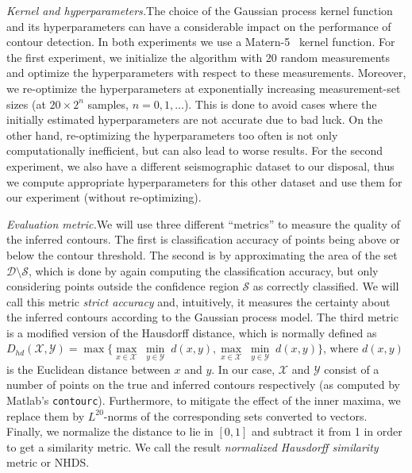\documentclass[11pt]{article} %
\begin{document}
\noindent\emph{Kernel and hyperparameters.}\;The choice of the Gaussian process
kernel function and its hyperparameters can have a considerable impact on the
performance of contour detection. In both experiments we use a
Matern-5~\cite{gpbook} kernel function. For the first experiment, we initialize
the algorithm with 20 random measurements and optimize the hyperparameters with
respect to these measurements. Moreover, we re-optimize the hyperparameters at
exponentially increasing measurement-set sizes
(at $20\times 2^n$ samples, $n = 0, 1,\ldots$). This is done to avoid cases
where the initially estimated hyperparameters are not accurate due to bad luck.
On the other hand, re-optimizing the hyperparameters too often is not only
computationally inefficient, but can also lead to worse results.
For the second experiment, we also have a different seismographic dataset
to our disposal, thus we compute appropriate hyperparameters for this other
dataset and use them for our experiment (without re-optimizing).

\noindent\emph{Evaluation metric.}\;We will use three different ``metrics'' to
measure the quality of the inferred contours. The first is classification
accuracy of points being above or below the contour threshold. The second is
by approximating the area of the set $\mathcal{D}\setminus\mathcal{S}$, which is
done by again computing the classification accuracy, but only considering points
outside the confidence region $\mathcal{S}$ as correctly classified.
We will call this metric \emph{strict accuracy} and, intuitively, it measures
the certainty about the inferred contours according to the Gaussian process
model. The third metric is a modified version of the Hausdorff distance, which
is normally defined as
$D_{hd}(\mathcal{X}, \mathcal{Y}) =
\max\{\underset{x\in\mathcal{X}}{\max}\;\underset{y\in\mathcal{Y}}{\min}\;d(x, y),
      \underset{x\in\mathcal{X}}{\max}\;\underset{y\in\mathcal{Y}}{\min}\;d(x, y)\}$,
where $d(x, y)$ is the Euclidean distance between $x$ and $y$.
In our case, $\mathcal{X}$ and $\mathcal{Y}$ consist of a number of points on
the true and inferred contours respectively (as computed by Matlab's
\texttt{contourc}). Furthermore, to mitigate the effect of the inner maxima,
we replace them by $L^{20}$-norms of the corresponding sets converted to
vectors. Finally, we normalize the distance to lie in $[0, 1]$ and subtract it
from 1 in order to get a similarity metric. We call the result
\emph{normalized Hausdorff similarity} metric or NHDS.
\end{document}

